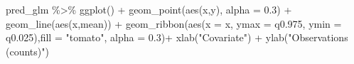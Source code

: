 \documentclass[
  letterpaper,
  DIV=11,
  numbers=noendperiod]{scrartcl}
\newenvironment{Shaded}{\begin{snugshade}}{\end{snugshade}}
\newcommand{\AttributeTok}[1]{\textcolor[rgb]{0.40,0.45,0.13}{#1}}
\newcommand{\FloatTok}[1]{\textcolor[rgb]{0.68,0.00,0.00}{#1}}
\newcommand{\FunctionTok}[1]{\textcolor[rgb]{0.28,0.35,0.67}{#1}}
\newcommand{\NormalTok}[1]{\textcolor[rgb]{0.00,0.23,0.31}{#1}}
\newcommand{\SpecialCharTok}[1]{\textcolor[rgb]{0.37,0.37,0.37}{#1}}
\newcommand{\StringTok}[1]{\textcolor[rgb]{0.13,0.47,0.30}{#1}}
\begin{document}
\begin{Shaded}
\begin{Highlighting}[]
\NormalTok{pred\_glm }\SpecialCharTok{\%\textgreater{}\%} \FunctionTok{ggplot}\NormalTok{() }\SpecialCharTok{+} 
  \FunctionTok{geom\_point}\NormalTok{(}\FunctionTok{aes}\NormalTok{(x,y), }\AttributeTok{alpha =} \FloatTok{0.3}\NormalTok{) }\SpecialCharTok{+}
  \FunctionTok{geom\_line}\NormalTok{(}\FunctionTok{aes}\NormalTok{(x,mean)) }\SpecialCharTok{+}
    \FunctionTok{geom\_ribbon}\NormalTok{(}\FunctionTok{aes}\NormalTok{(}\AttributeTok{x =}\NormalTok{ x, }\AttributeTok{ymax =}\NormalTok{ q0}\FloatTok{.975}\NormalTok{, }\AttributeTok{ymin =}\NormalTok{ q0}\FloatTok{.025}\NormalTok{),}\AttributeTok{fill =} \StringTok{"tomato"}\NormalTok{, }\AttributeTok{alpha =} \FloatTok{0.3}\NormalTok{)}\SpecialCharTok{+}
  \FunctionTok{xlab}\NormalTok{(}\StringTok{"Covariate"}\NormalTok{) }\SpecialCharTok{+} \FunctionTok{ylab}\NormalTok{(}\StringTok{"Observations (counts)"}\NormalTok{)}
\end{Highlighting}
\end{Shaded}
\end{document}
